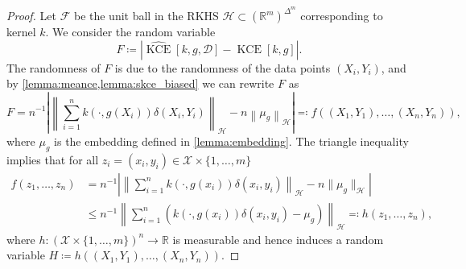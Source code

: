 \documentclass{article}
\DeclareMathOperator{\kernelmeasure}{KCE}
\begin{document}
\begin{proof}
  Let $\mathcal{F}$ be the unit ball in the RKHS
  $\mathcal{H} \subset {(\mathbb{R}^m)}^{\Delta^m}$ corresponding to kernel $k$.
  We consider the random variable
  \begin{equation*}
    F \coloneqq \left|\widehat{\kernelmeasure}[k, g, \mathcal{D}] - \kernelmeasure[k, g]\right|.
  \end{equation*}
  The randomness of $F$ is due to the randomness of the data points
  $(X_i, Y_i)$, and by \cref{lemma:meance,lemma:skce_biased} we can rewrite $F$
  as
  \begin{equation*}
    F = n^{-1} \left| \left\|\sum_{i=1}^n k(\cdot, g(X_i)) \delta(X_i, Y_i) \right\|_{\mathcal{H}} - n \left\| \mu_g \right\|_{\mathcal{H}} \right| \eqqcolon f((X_1, Y_1), \ldots, (X_n, Y_n)),
  \end{equation*}
  where $\mu_g$ is the embedding defined in \cref{lemma:embedding}. The triangle
  inequality implies that for all
  $z_i = (x_i, y_i) \in \mathcal{X} \times \{1,\ldots,m\}$
  \begin{equation}\label{eq:F_leq_H}
    \begin{split}
      f(z_1, \ldots, z_n) &= n^{-1} \left| \left\| \sum_{i=1}^n k(\cdot, g(x_i)) \delta(x_i, y_i) \right\|_{\mathcal{H}} - n \|\mu_g \|_{\mathcal{H}} \right| \\
      &\leq n^{-1} \left\|\sum_{i=1}^n \left(k(\cdot, g(x_i)) \delta(x_i, y_i) - \mu_g\right)\right\|_{\mathcal{H}} \eqqcolon h(z_1, \ldots, z_n),
    \end{split}
  \end{equation}
  where $h \colon {(\mathcal{X} \times \{1,\ldots,m\})}^n \to \mathbb{R}$ is
  measurable and hence induces a random variable
  $H \coloneqq h((X_1,Y_1),\ldots,(X_n,Y_n))$.


\end{proof}
\end{document}
